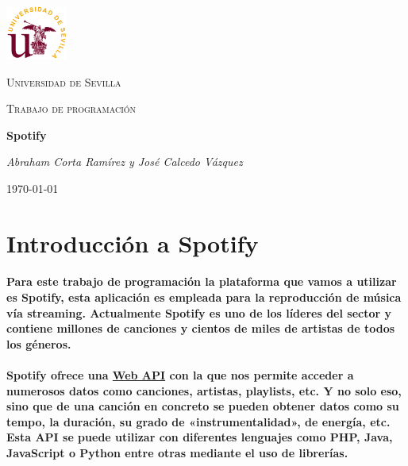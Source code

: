 \documentclass[11pt,spanish]{article}
\begin{document}
\begin{titlepage}
	\centering
	\includegraphics[width=0.15\textwidth]{Emblema_Universidad_de_Sevilla.png}\par\vspace{1cm}
	{\scshape\LARGE Universidad de Sevilla \par}
	\vspace{1cm}
	{\scshape\Large Trabajo de programación\par}
	\vspace{1.5cm}
	{\huge\bfseries Spotify\par}
	\vspace{2cm}
	{\Large\itshape Abraham Corta Ramírez y José Calcedo Vázquez\par}
	\vfill
	
	{\large \today\par}
\end{titlepage}



\newpage
{}

\tableofcontents

\listoffigures

\clearpage

\section{Introducción a Spotify}

\paragraph*{Para este trabajo de programación la plataforma que vamos a utilizar es Spotify, esta aplicación es empleada para la reproducción de música vía streaming. Actualmente Spotify es uno de los líderes del sector y contiene millones de canciones y cientos de miles de artistas de todos los géneros.}

\paragraph*{Spotify ofrece una \href{https://developer.spotify.com/documentation/web-api/}{Web API} con la que nos permite acceder a numerosos datos como canciones, artistas, playlists, etc. Y no solo eso, sino que de una canción en concreto se pueden obtener datos como su tempo, la duración, su grado de «instrumentalidad», de energía, etc. Esta API se puede utilizar con diferentes lenguajes como PHP, Java, JavaScript o Python entre otras mediante el uso de librerías.}
\end{document}
